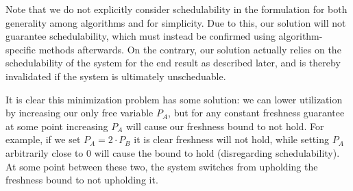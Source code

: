 Note that we do not explicitly consider schedulability in the formulation for both generality among algorithms and for simplicity. Due to this, our solution will not guarantee schedulability, which must instead be confirmed using algorithm-specific methods afterwards. On the contrary, our solution actually relies on the schedulability of the system for the end result as described later, and is thereby invalidated if the system is ultimately unscheduable.

It is clear this minimization problem has some solution: we can lower utilization by increasing our only free variable $P_A$, but for any constant freshness guarantee at some point increasing $P_A$ will cause our freshness bound to not hold. For example, if we set $P_A = 2 \cdot P_B$ it is clear freshness will not hold, while setting $P_A$ arbitrarily close to $0$ will cause the bound to hold (disregarding schedulability). At some point between these two, the system switches from upholding the freshness bound to not upholding it.